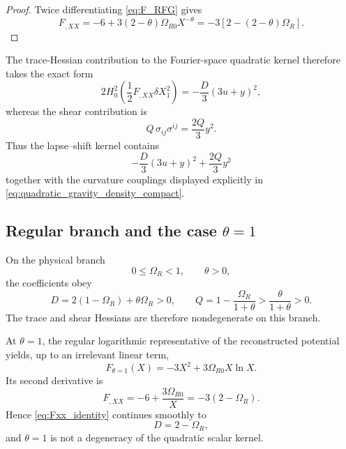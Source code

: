 \documentclass[11pt,a4paper]{article}
\begin{document}
\begin{proof}
Twice differentiating \eqref{eq:F_RFG} gives
\[
F_{,XX}
=
-6+3(2-\theta)\Omega_{R0}X^{-\theta}
=
-3\left[2-(2-\theta)\Omega_R\right].
\]
\end{proof}

The trace-Hessian contribution to the Fourier-space quadratic kernel therefore
takes the exact form
\begin{equation}
2H_0^2\left(\frac{1}{2}F_{,XX}\delta X_1^2\right)
=
-\frac{D}{3}(3u+y)^2,
\label{eq:trace_hessian_kernel}
\end{equation}
whereas the shear contribution is
\begin{equation}
Q\,\sigma_{ij}\sigma^{ij}
=
\frac{2Q}{3}y^2.
\label{eq:shear_kernel}
\end{equation}
Thus the lapse--shift kernel contains
\begin{equation}
\boxed{
-\frac{D}{3}(3u+y)^2+\frac{2Q}{3}y^2
}
\label{eq:lapse_shift_kernel}
\end{equation}
together with the curvature couplings displayed explicitly in
\eqref{eq:quadratic_gravity_density_compact}.

\subsection{Regular branch and the case \texorpdfstring{\(\theta=1\)}{theta=1}}

On the physical branch
\begin{equation}
0\leq\Omega_R<1,\qquad \theta>0,
\end{equation}
the coefficients obey
\begin{equation}
D=2(1-\Omega_R)+\theta\Omega_R>0,
\qquad
Q=1-\frac{\Omega_R}{1+\theta}>
\frac{\theta}{1+\theta}>0.
\label{eq:D_Q_positive}
\end{equation}
The trace and shear Hessians are therefore nondegenerate on this branch.

At \(\theta=1\), the regular logarithmic representative of the reconstructed
potential yields, up to an irrelevant linear term,
\begin{equation}
F_{\theta=1}(X)
=
-3X^2+3\Omega_{R0}X\ln X.
\end{equation}
Its second derivative is
\begin{equation}
F_{,XX}
=
-6+\frac{3\Omega_{R0}}{X}
=
-3(2-\Omega_R).
\end{equation}
Hence \eqref{eq:Fxx_identity} continues smoothly to
\begin{equation}
D=2-\Omega_R,
\end{equation}
and \(\theta=1\) is not a degeneracy of the quadratic scalar kernel.
\end{document}
